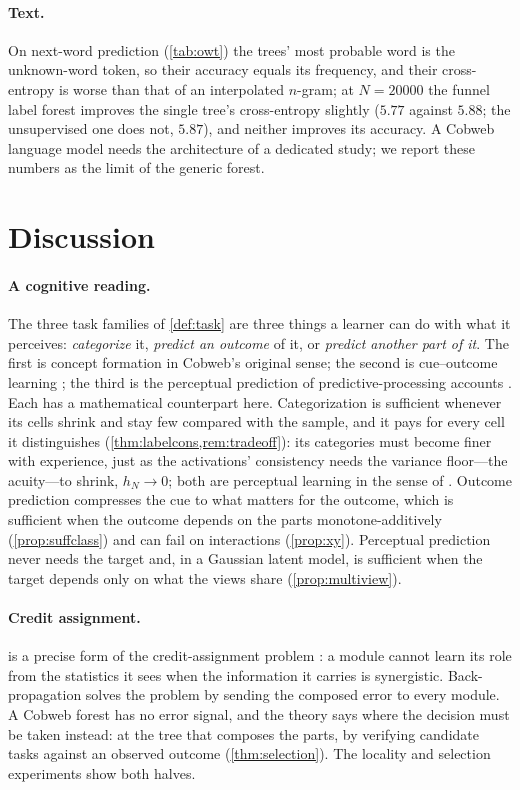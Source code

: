 \documentclass[11pt]{article}
\theoremstyle{definition}
\theoremstyle{remark}
\begin{document}
\paragraph{Text.}
On next-word prediction (\cref{tab:owt}) the trees' most probable word is the unknown-word
token, so their accuracy equals its frequency, and their cross-entropy is worse than that
of an interpolated $n$-gram; at $N=20000$ the funnel label forest improves the single tree's
cross-entropy slightly ($5.77$ against $5.88$; the unsupervised one does not, $5.87$), and
neither improves its accuracy.  A Cobweb language
model needs the architecture of a dedicated study; we report these numbers as the limit
of the generic forest.

\section{Discussion}\label{sec:discussion}

\paragraph{A cognitive reading.}
The three task families of \cref{def:task} are three things a learner can do with what it
perceives: \emph{categorize} it, \emph{predict an outcome} of it, or \emph{predict
another part of it}.  The first is concept formation in Cobweb's original sense; the
second is cue--outcome learning \citep{rescorla1972}; the third is the perceptual
prediction of predictive-processing accounts \citep{clark2013}.  Each has a mathematical
counterpart here.  Categorization is sufficient whenever its cells shrink and stay few compared with the
sample, and it pays for every cell it distinguishes (\cref{thm:labelcons,rem:tradeoff}):
its categories must become finer with experience, just as the activations' consistency
needs the variance floor---the acuity---to shrink, $h_N\to0$; both are perceptual learning
in the sense of \citet{goldstone1998}.  Outcome prediction
compresses the cue to what matters for the outcome, which is sufficient when the
outcome depends on the parts monotone-additively (\cref{prop:suffclass}) and can fail on
interactions (\cref{prop:xy}).  Perceptual prediction never needs the target and, in a
Gaussian latent model, is sufficient when the target depends only on what the views
share (\cref{prop:multiview}).

\paragraph{Credit assignment.}
 is a precise form of the credit-assignment problem
\citep{minsky1961}: a module cannot learn its role from the statistics it sees when the
information it carries is synergistic.  Back-propagation solves the problem by sending
the composed error to every module.  A Cobweb forest has no error signal, and the theory
says where the decision must be taken instead: at the tree that composes the parts, by
verifying candidate tasks against an observed outcome (\cref{thm:selection}).  The
locality and selection experiments show both halves.
\end{document}
